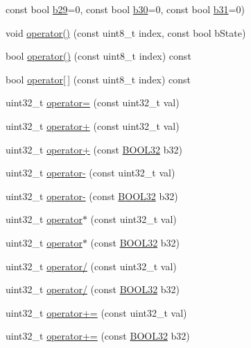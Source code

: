 \begin{DoxyCompactItemize}
const bool \hyperlink{struct_b_o_o_l32_aa6221372ff8300c8770ccc453b771371}{b29}=0, const bool \hyperlink{struct_b_o_o_l32_ae40d7746427401204e58a08df5b05362}{b30}=0, const bool \hyperlink{struct_b_o_o_l32_a72b1e721a9693db3cdf462c475c11d4b}{b31}=0)
\item 
void \hyperlink{struct_b_o_o_l32_a3d33ecdccb02bb7e2093c5de50a5ac5e}{operator()} (const uint8\+\_\+t index, const bool b\+State)
\item 
bool \hyperlink{struct_b_o_o_l32_a525b18fe28c1fad0527214591e60d2a2}{operator()} (const uint8\+\_\+t index) const
\item 
bool \hyperlink{struct_b_o_o_l32_aa3890549e1c6f9b8e4ef5d7a55188e75}{operator\mbox{[}$\,$\mbox{]}} (const uint8\+\_\+t index) const
\item 
uint32\+\_\+t \hyperlink{struct_b_o_o_l32_ab582d5fba135322358f803b380a39d65}{operator=} (const uint32\+\_\+t val)
\item 
uint32\+\_\+t \hyperlink{struct_b_o_o_l32_aad0beeb169c1b861a4f279f8159a5c44}{operator+} (const uint32\+\_\+t val)
\item 
uint32\+\_\+t \hyperlink{struct_b_o_o_l32_acb3d1666d776c603913af221dcb313d5}{operator+} (const \hyperlink{struct_b_o_o_l32}{B\+O\+O\+L32} b32)
\item 
uint32\+\_\+t \hyperlink{struct_b_o_o_l32_a5813927e84bb669873f9015cf9cac108}{operator-\/} (const uint32\+\_\+t val)
\item 
uint32\+\_\+t \hyperlink{struct_b_o_o_l32_abfab8de78f49788c07437164a7540a0b}{operator-\/} (const \hyperlink{struct_b_o_o_l32}{B\+O\+O\+L32} b32)
\item 
uint32\+\_\+t \hyperlink{struct_b_o_o_l32_ae8ce040f2975c8bb51c8a93289a54dd3}{operator$\ast$} (const uint32\+\_\+t val)
\item 
uint32\+\_\+t \hyperlink{struct_b_o_o_l32_ae05d59f2c1aa44faeda63f93d8f1ec92}{operator$\ast$} (const \hyperlink{struct_b_o_o_l32}{B\+O\+O\+L32} b32)
\item 
uint32\+\_\+t \hyperlink{struct_b_o_o_l32_a133aba6289e92b27ed583f6e4a480335}{operator/} (const uint32\+\_\+t val)
\item 
uint32\+\_\+t \hyperlink{struct_b_o_o_l32_a5cbc400dd5c8d349dd311f6d08dc2a6c}{operator/} (const \hyperlink{struct_b_o_o_l32}{B\+O\+O\+L32} b32)
\item 
uint32\+\_\+t \hyperlink{struct_b_o_o_l32_aee7cc8e8189647b8812cd73a5a6d2730}{operator+=} (const uint32\+\_\+t val)
\item 
uint32\+\_\+t \hyperlink{struct_b_o_o_l32_aa5f5168d040732ad4e2f32544b857ed3}{operator+=} (const \hyperlink{struct_b_o_o_l32}{B\+O\+O\+L32} b32)

\end{DoxyCompactItemize}
